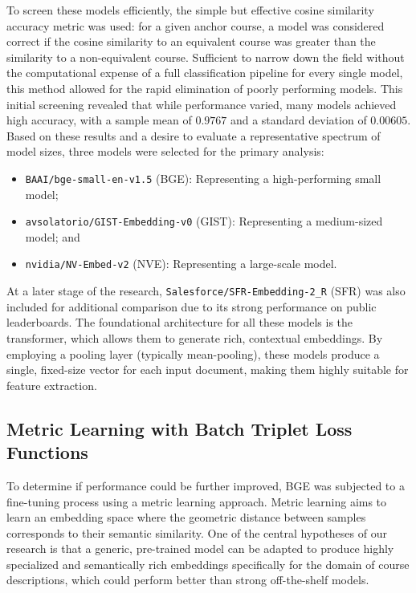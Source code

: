 To screen these models efficiently, the simple but effective cosine similarity accuracy metric was used: for a given anchor course, a model was considered correct if the cosine similarity to an equivalent course was greater than the similarity to a non-equivalent course. Sufficient to narrow down the field without the computational expense of a full classification pipeline for every single model, this method allowed for the rapid elimination of poorly performing models. This initial screening revealed that while performance varied, many models achieved high accuracy, with a sample mean of \(0.9767\) and a standard deviation of \(0.00605\). Based on these results and a desire to evaluate a representative spectrum of model sizes, three models were selected for the primary analysis:
\begin{itemize}
    \item \verb|BAAI/bge-small-en-v1.5| (BGE): Representing a high-performing small model;
    \item \verb|avsolatorio/GIST-Embedding-v0| (GIST): Representing a medium-sized model; and
    \item \verb|nvidia/NV-Embed-v2| (NVE): Representing a large-scale model.
\end{itemize}

At a later stage of the research, \verb|Salesforce/SFR-Embedding-2_R| (SFR) was also included for additional comparison due to its strong performance on public leaderboards. The foundational architecture for all these models is the transformer, which allows them to generate rich, contextual embeddings. By employing a pooling layer (typically mean-pooling), these models produce a single, fixed-size vector for each input document, making them highly suitable for feature extraction.

\subsection{Metric Learning with Batch Triplet Loss Functions}
To determine if performance could be further improved, BGE was subjected to a fine-tuning process using a metric learning approach. Metric learning aims to learn an embedding space where the geometric distance between samples corresponds to their semantic similarity.  One of the central hypotheses of our research is that a generic, pre-trained model can be adapted to produce highly specialized and semantically rich embeddings specifically for the domain of course descriptions, which could perform better than strong off-the-shelf models.

